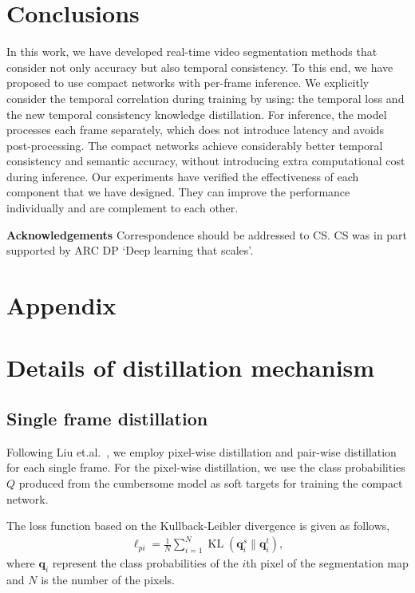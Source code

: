 \documentclass[runningheads]{llncs}
\begin{document}
\section{Conclusions}
In this work, we have developed real-time video segmentation methods that consider not only accuracy but also temporal consistency. To this end,
we have proposed to use compact networks
with per-frame inference. We explicitly consider the temporal correlation during training by using: the temporal loss and the new temporal consistency knowledge distillation.
For inference,
the model
processes
each frame separately, which
does not introduce
latency and avoids post-processing.
The compact networks achieve considerably better temporal consistency and semantic accuracy, without introducing
extra computational cost during inference. Our experiments have verified the effectiveness of each component that we have designed. They can improve the performance individually and are  complement to each other.









\textbf{Acknowledgements}
Correspondence should be addressed to CS.
CS was in part supported by ARC DP `Deep learning that scales'.


\appendix



\section*{Appendix}


\section{Details of distillation mechanism}
\subsection{Single frame distillation}
Following Liu et.al.~\cite{liu2019structured}, we employ pixel-wise distillation and pair-wise distillation for each single frame.
For the pixel-wise distillation, we use the class probabilities $Q$ produced from the cumbersome model as {soft targets} for training the compact network.

The loss function based on the Kullback$\textrm{-}$Leibler divergence is given as follows,
\begin{align}
\ell_{pi} = \frac{1}{N} \sum_{i=1}^{N} \operatorname{KL}(\mathbf{q}^s_i \| \mathbf{q}^t_i),
\end{align}
where $\mathbf{q}_i$ represent the class probabilities
of the $i$th pixel of the segmentation map and $N$ is the number of the pixels.
\end{document}
